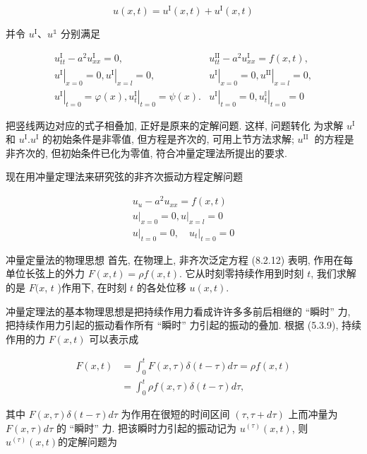 $$
u(x, t)=u^{\mathrm{I}}(x, t)+u^{\mathrm{I}}(x, t)
$$

并令 $u^{\mathrm{I}} 、 u^{\mathbb{1}}$ 分别满足

$$
\begin{array}{l|l}
u_{t t}^{\mathrm{I}}-a^{2} u_{x x}^{\mathrm{I}}=0, & u_{t t}^{\mathrm{II}}-a^{2} u_{x x}^{\mathrm{I}}=f(x, t), \\
\left.u^{\mathrm{I}}\right|_{x=0}=0,\left.u^{\mathrm{I}}\right|_{x=l}=0, & \left.u^{\mathrm{I}}\right|_{x=0}=0,\left.u^{\mathrm{II}}\right|_{x=l}=0, \\
\left.u^{\mathrm{I}}\right|_{t=0}=\varphi(x),\left.u_{t}^{\mathrm{I}}\right|_{t=0}=\psi(x) . & \left.u^{\mathrm{I}}\right|_{t=0}=0,\left.u_{t}^{\mathbb{I}}\right|_{t=0}=0
\end{array}
$$

把竖线两边对应的式子相叠加, 正好是原来的定解问题. 这样, 问题转化
为求解 $u^{\mathrm{I}}$ 和 $u^{\mathrm{I}} . u^{\mathrm{I}}$ 的初始条件是非零值, 但方程是齐次的, 可用上节方法求解; $u^{\text {II }}$ 的方程是非齐次的, 但初始条件已化为零值, 符合冲量定理法所提出的要求.

现在用冲量定理法来研究弦的非齐次振动方程定解问题

$$
\begin{gathered}
u_{u}-a^{2} u_{x x}=f(x, t) \\
\left.u\right|_{x=0}=0,\left.u\right|_{x=l}=0 \\
\left.u\right|_{t=0}=0,\left.\quad u_{t}\right|_{t=0}=0
\end{gathered}
$$

冲量定量法的物理思想
首先, 在物理上, 非齐次泛定方程 (8.2.12) 表明, 作用在每单位长弦上的外力 $F(x, t)=\rho f(x, t)$. 它从时刻零持续作用到时刻 $t$, 我们求解的是 $F(x$, $t$ )作用下, 在时刻 $t$ 的各处位移 $u(x, t)$.

冲量定理法的基本物理思想是把持续作用力看成许许多多前后相继的 “瞬时” 力, 把持续作用力引起的振动看作所有 “瞬时” 力引起的振动的叠加. 根据 (5.3.9), 持续作用的力 $F(x, t)$ 可以表示成

$$
\begin{aligned}
F(x, t) & =\int_{0}^{t} F(x, \tau) \delta(t-\tau) d \tau=\rho f(x, t) \\
& =\int_{0}^{t} \rho f(x, \tau) \delta(t-\tau) d \tau,
\end{aligned}
$$

其中 $F(x, \tau) \delta(t-\tau) d \tau$ 为作用在很短的时间区间 $(\tau, \tau+d \tau)$ 上而冲量为 $F(x, \tau) d \tau$ 的 “瞬时” 力. 把该瞬时力引起的振动记为 $u^{(\tau)}(x, t)$, 则 $u^{(\tau)}(x, t)$的定解问题为

